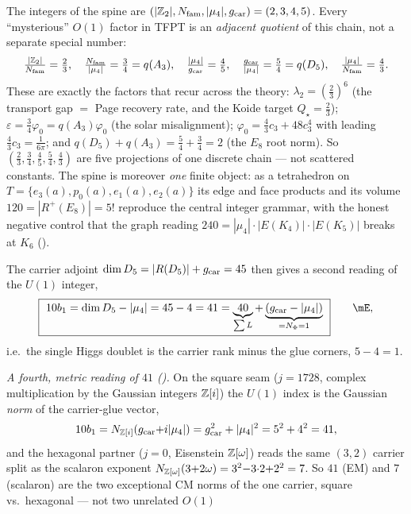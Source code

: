 \begin{keybox}
The integers of the spine are $(|\mathbb{Z}_2|,N_{\mathrm{fam}},|\mu_4|,g_{\mathrm{car}})=(2,3,4,5)$. Every ``mysterious'' $O(1)$ factor in
TFPT is an \emph{adjacent quotient} of this chain, not a separate special number:
\[
  \tfrac{|\mathbb{Z}_2|}{N_{\mathrm{fam}}}=\tfrac23,\quad \tfrac{N_{\mathrm{fam}}}{|\mu_4|}=\tfrac34=q(A_3),\quad
  \tfrac{|\mu_4|}{g_{\mathrm{car}}}=\tfrac45,\quad \tfrac{g_{\mathrm{car}}}{|\mu_4|}=\tfrac54=q(D_5),\quad \tfrac{|\mu_4|}{N_{\mathrm{fam}}}=\tfrac43 .
\]
These are exactly the factors that recur across the theory: $\lambda_2=(\tfrac23)^6$ (the transport gap
$=$ Page recovery rate, and the Koide target $Q_\star=\tfrac23$); $\varepsilon=\tfrac34\varphi_0=q(A_3)\varphi_0$
(the solar misalignment); $\varphi_0=\tfrac43 c_3+48c_3^4$ with leading $\tfrac43 c_3=\tfrac1{6\pi}$; and
$q(D_5){+}q(A_3)=\tfrac54{+}\tfrac34=2$ (the $E_8$ root norm). So $(\tfrac23,\tfrac34,\tfrac45,\tfrac54,\tfrac43)$
are five projections of one discrete chain --- not scattered constants. The spine is moreover \emph{one}
finite object: as a tetrahedron on $T=\{e_3(a),p_0(a),e_1(a),e_2(a)\}$ its edge and face products and its
volume $120=|R^+(E_8)|=5!$ reproduce the central integer grammar, with the honest negative control that
the graph reading $240=|\mu_4|\cdot|E(K_4)|\cdot|E(K_5)|$ breaks at $K_6$
().
\end{keybox} The carrier adjoint $\dim D_5=|R(D_5)|+g_{\mathrm{car}}=45$
then gives a second reading of the $U(1)$ integer,
\begin{equation}
  \boxed{\ 10b_1=\dim D_5-|\mu_4|=45-4=41=\underbrace{40}_{\sum L}+\underbrace{(\gcar-|\mu_4|)}_{=N_\Phi=1}\ }\qquad\mE ,
\end{equation}
i.e.\ the single Higgs doublet is the carrier rank minus the glue corners, $5-4=1$.
\par\smallskip
\noindent\emph{A fourth, metric reading of $41$ ().} On the square seam
($j{=}1728$, complex multiplication by the Gaussian integers $\mathbb{Z}[i]$) the $U(1)$ index is the Gaussian
\emph{norm} of the carrier-glue vector,
\[
  10b_1=N_{\mathbb{Z}[i]}(g_{\mathrm{car}}{+}i|\mu_4|)=g_{\mathrm{car}}^2+|\mu_4|^2=5^2+4^2=41 ,
\]
and the hexagonal partner ($j{=}0$, Eisenstein $\mathbb{Z}[\omega]$) reads the same $(3,2)$ carrier split as the
scalaron exponent $N_{\mathbb{Z}[\omega]}(3{+}2\omega)=3^2{-}3{\cdot}2{+}2^2=7$. So $41$ (EM) and $7$ (scalaron)
are the two exceptional CM norms of the one carrier, square vs.\ hexagonal --- not two unrelated $O(1)$
